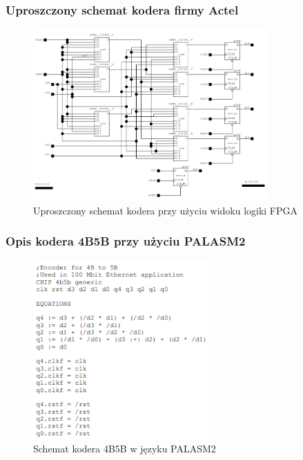 \documentclass{article}
\begin{document}
\subsubsection{Uproszczony schemat kodera firmy Actel}
\begin{figure}[H]  
    \centering
    \includegraphics[width=0.8\textwidth]{fpga-4b5b.png}
    \caption{Uproszczony schemat kodera przy użyciu widoku logiki FPGA}
    \label{fig:mojobrazek2}
\end{figure}

\subsubsection{Opis kodera 4B5B przy użyciu PALASM2}
\begin{figure}[H]  
    \centering
    \includegraphics[width=0.6\textwidth]{palasm2.png}
    \caption{Schemat kodera 4B5B w języku PALASM2}
    \label{fig:mojobrazek3}
\end{figure}

\newpage
\end{document}
